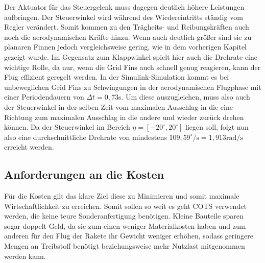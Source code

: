 Der Aktuator für das Steuergelenk muss dagegen deutlich höhere Leistungen aufbringen. Der Steuerwinkel wird während des Wiedereintritts ständig vom Regler verändert. Somit kommen zu den Trägheits- und Reibungskräften auch noch die aerodynamischen Kräfte hinzu. Wenn auch deutlich größer sind sie zu planaren Finnen jedoch vergleichsweise gering, wie in dem vorherigen Kapitel gezeigt wurde. Im Gegensatz zum Klappwinkel spielt hier auch die Drehrate eine wichtige Rolle, da nur, wenn die Grid Fins auch schnell genug reagieren, kann der Flug effizient geregelt werden. In der Simulink-Simulation kommt es bei unbeweglichen Grid Fins zu Schwingungen in der aerodynamischen Flugphase mit einer Periodendauern von $\Delta t=0,73$s. Um diese auszugleichen, muss also auch der Steuerwinkel in der selben Zeit vom maximalen Ausschlag in die eine Richtung zum maximalen Ausschlag in die andere und wieder zurück drehen können. Da der Steuerwinkel im Bereich $\eta = [-20^\circ,20^\circ]$ liegen soll, folgt nun also eine durchschnittliche Drehrate von mindestens $109,59^\circ/\mathrm{s}=1,913\mathrm{rad/s}$ erreicht werden.
\subsection{Anforderungen an die Kosten}
Für die Kosten gilt das klare Ziel diese zu Minimieren und somit maximale Wirtschaftlichkeit zu erreichen. Somit sollen so weit es geht COTS verwendet werden, die keine teure Sonderanfertigung benötigen. Kleine Bauteile sparen sogar doppelt Geld, da sie zum einen weniger Materialkosten haben und zum anderen für den Flug der Rakete ihr Gewicht weniger erhöhen, sodass geringere Mengen an Treibstoff benötigt beziehungsweise mehr Nutzlast mitgenommen werden kann.
